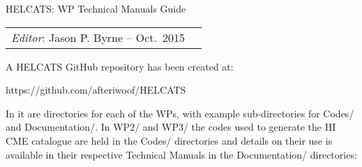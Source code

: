 \documentclass[12pt, a4paper, oneside]{article}
\begin{document}








\begin{center}
{\sc \Large HELCATS: WP Technical Manuals Guide}
\end{center}

 
\begin{center}
\begin{tabular}{ll}
\textit{Editor}: Jason P. Byrne -- Oct.~2015
\end{tabular}
\end{center}
 
 
 \setlength{\parskip}{1em}




\noindent A HELCATS GitHub repository has been created at:

 https://github.com/afteriwoof/HELCATS

\noindent In it are directories for each of the WPs, with example sub-directories for Codes/ and Documentation/. In WP2/ and WP3/ the codes used to generate the HI CME catalogue are held in the Codes/ directories and details on their use is available in their respective Technical Manuals in the Documentation/ directories:
\end{document}
